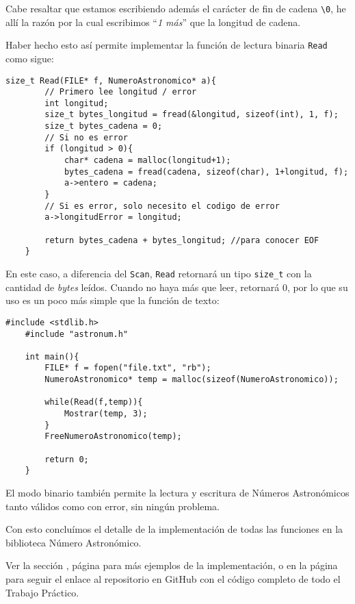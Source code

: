 \documentclass[a4paper, 12pt]{article}
\begin{document}
Cabe resaltar que estamos escribiendo además el carácter de fin de cadena \verb|\0|, he allí la razón por la cual escribimos ``\emph{1 más}'' que la longitud de cadena.

Haber hecho esto así permite implementar la función de lectura binaria \verb|Read| como sigue:

\begin{lstlisting}[style=C]
    size_t Read(FILE* f, NumeroAstronomico* a){
        // Primero lee longitud / error
        int longitud;
        size_t bytes_longitud = fread(&longitud, sizeof(int), 1, f);
        size_t bytes_cadena = 0;
        // Si no es error
        if (longitud > 0){
            char* cadena = malloc(longitud+1);
            bytes_cadena = fread(cadena, sizeof(char), 1+longitud, f);
            a->entero = cadena;
        }
        // Si es error, solo necesito el codigo de error
        a->longitudError = longitud;
    
        return bytes_cadena + bytes_longitud; //para conocer EOF
    }
\end{lstlisting}

En este caso, a diferencia del \texttt{Scan}, \texttt{Read} retornará un tipo \verb|size_t| con la cantidad de \emph{bytes} leídos. Cuando no haya más que leer, retornará 0, por lo que su uso es un poco más simple que la función de texto:

\begin{lstlisting}[style=C]
    #include <stdlib.h>
    #include "astronum.h"
    
    int main(){
        FILE* f = fopen("file.txt", "rb");
        NumeroAstronomico* temp = malloc(sizeof(NumeroAstronomico));
        
        while(Read(f,temp)){
            Mostrar(temp, 3);
        }
        FreeNumeroAstronomico(temp);
        
        return 0;
    }
\end{lstlisting}

El modo binario también permite la lectura y escritura de Números Astronómicos tanto válidos como con error, sin ningún problema.

Con esto concluímos el detalle de la implementación de todas las funciones en la biblioteca Número Astronómico.

Ver la sección , página \pageref{ejemplos} para más ejemplos de la implementación, o en la página \pageref{github} para seguir el enlace al repositorio en GitHub con el código completo de todo el Trabajo Práctico.
\end{document}
